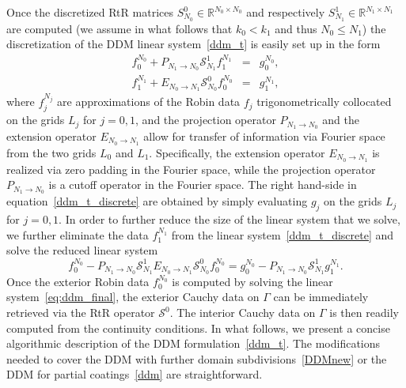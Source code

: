 \documentclass[11pt]{article}
\numberwithin{equation}{section}
\begin{document}
Once the discretized RtR matrices $S^0_{N_0}\in \mathbb{R}^{N_0\times N_0}$ and respectively $S^1_{N_1}\in \mathbb{R}^{N_1\times N_1}$ are computed (we assume in what follows that $k_0<k_1$ and thus $N_0\leq N_1$) the discretization of the DDM linear system~\eqref{ddm_t} is easily set up in the form
\begin{eqnarray}\label{ddm_t_discrete}
  f_0^{N_0} + P_{N_1\to N_0}\mathcal{S}^1_{N_1}f_1^{N_1}&=&g_0^{N_0},\nonumber\\
  f_1^{N_1} +E_{N_0\to N_1}\mathcal{S}^0_{N_0}f_0^{N_0}&=&g_1^{N_1},
 \end{eqnarray}
where $f_j^{N_j}$ are approximations of the Robin data $f_j$ trigonometrically collocated on the grids $L_j$ for $j=0,1$, and the projection operator $P_{N_1\to N_0}$ and the extension operator $E_{N_0\to N_1}$ allow for transfer of information via Fourier space from the two grids $L_0$ and $L_1$. Specifically, the extension operator $E_{N_0\to N_1}$ is realized via zero padding in the Fourier space, while the projection operator $P_{N_1\to N_0}$ is a cutoff operator in the Fourier space. The right hand-side in equation~\eqref{ddm_t_discrete} are obtained by simply evaluating $g_j$ on the grids $L_j$ for $j=0,1$. In order to further reduce the size of the linear system that we solve, we further eliminate the data $f_1^{N_1}$ from the linear system~\eqref{ddm_t_discrete} and solve the reduced linear system
\begin{equation}\label{eq:ddm_final}
  f_0^{N_0}-P_{N_1\to N_0}\mathcal{S}^1_{N_1}E_{N_0\to N_1}\mathcal{S}^0_{N_0}f_0^{N_0}=g_0^{N_0}-P_{N_1\to N_0}\mathcal{S}^1_{N_1}g_1^{N_1}.
  \end{equation}
Once the exterior Robin data $f_0^{N_0}$ is computed by solving the linear system~\eqref{eq:ddm_final}, the exterior Cauchy data on $\Gamma$ can be immediately retrieved via the RtR operator $\mathcal{S}^0$. The interior Cauchy data on $\Gamma$ is then readily computed from the continuity conditions. In what follows, we present a concise algorithmic description of the DDM formulation~\eqref{ddm_t}. The modifications needed to cover the DDM with further domain subdivisions~\eqref{DDMnew} or the DDM for partial coatings~\eqref{ddm} are straightforward.  
\end{document}
